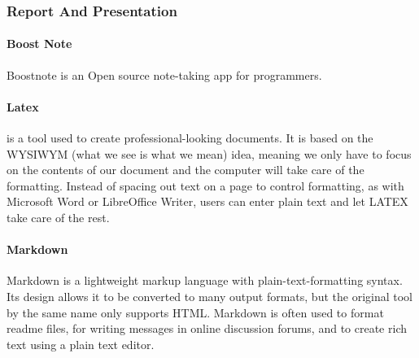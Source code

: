 \subsubsection{Report And Presentation}
\paragraph*{Boost Note}
Boostnote is an Open source note-taking app for programmers.

\paragraph*{Latex}
\latex{} is a tool used to create professional-looking documents. It is based on the WYSIWYM (what we see is what we mean) idea, meaning we only have to focus on the contents of our document and the computer will take care of the formatting. Instead of spacing out text on a page to control formatting, as with Microsoft Word or LibreOffice Writer, users can enter plain text and let LATEX take care of the rest.




\paragraph*{Markdown}
Markdown is a lightweight markup language with plain-text-formatting syntax. Its design allows it to be converted to many output formats, but the original tool by the same name only supports HTML. Markdown is often used to format readme files, for writing messages in online discussion forums, and to create rich text using a plain text editor.

